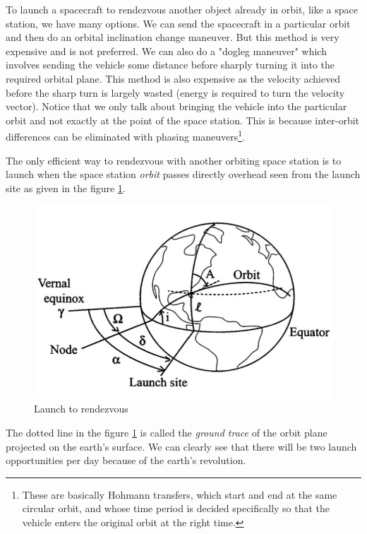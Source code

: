 \documentclass{article}
\theoremstyle{definition}
\begin{document}
To launch a spacecraft to rendezvous another object already in orbit, like a space station, we have many options.
We can send the spacecraft in a particular orbit and then do an orbital inclination change maneuver. But this method is very expensive and is not preferred.
We can also do a "dogleg maneuver" which involves sending the vehicle some distance before sharply turning it into the required orbital plane. This method is also expensive as the velocity achieved before the sharp turn is largely wasted (energy is required to turn the velocity vector).
Notice that we only talk about bringing the vehicle into the particular orbit and not exactly at the point of the space station. This is because inter-orbit differences can be eliminated with phasing maneuvers\footnote{These are basically Hohmann transfers, which start and end at the same circular orbit, and whose time period is decided specifically so that the vehicle enters the original orbit at the right time.}. \medskip

The only efficient way to rendezvous with another orbiting space station is to launch when the space station \emph{orbit} passes directly overhead seen from the launch site as given in the figure \ref{fig:l_r}.

\begin{figure}[h]
    \centering
    \includegraphics[scale=0.3]{image 7.jpeg}
    \caption{Launch to rendezvous}
    \label{fig:l_r}
\end{figure}

The dotted line in the figure \ref{fig:l_r} is called the \emph{ground trace} of the orbit plane projected on the earth's surface. We can clearly see that there will be two launch opportunities per day because of the earth's revolution.
\end{document}
